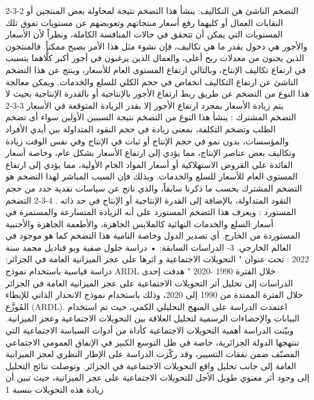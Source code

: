 \documentclass[12pt,a4paper]{report}
\begin{document}
2-3-2 التضخم الناشئ هن التكاليف:
ينشأ هذا التضخم نتيجة لمحاولة بعض المنتجين أو النقابات العمال أو كليهما رفع أسعار منتجاتهم وتعويضهم عن مستويات تفوق تلك المستويات التي يمكن أن تتحقق في حالات المنافسة الكاملة، ونظراً لأن الأسعار والأجور هي دخول بقدر ما هي تكاليف، فإن نشوء مثل هذا الأمر يصبح ممكناً.
فالمنتجون الذين يجنون من معدلات ربح أعلى، والعمال الذين يرغبون في أجور أكبر كلٌّاهما يتسبب في ارتفاع تكاليف الإنتاج، وبالتالي ارتفاع المستوى العام للأسعار، وينتج عن هذا التضخم الناشئ عن ارتفاع التكاليف انخفاض في حجم الكلي للسلع والخدمات. ويمكن معالجة هذا النوع من التضخم عن طريق ربط ارتفاع الأجور بالإنتاجية أو بالقدرة الإنتاجية بحيث لا يتم زيادة الأسعار بمجرد ارتفاع الأجور إلا بقدر الزيادة المتوقعة في الأسعار
3-3-2 التضخم المشترك : 
ينشأ هذا النوع من التضخم نتيجة السببين الأولين سواء أى تضخم الطلب وتضخم التكلفة، بمعنى زيادة في حجم النقود المتداولة بين أيدي الأفراد والمؤسسات، بدون نمو في حجم الإنتاج أو ثبات في الإنتاج وفي نفس الوقت زيادة وتكاليف بعض عناصر الإنتاج، مما يؤدي إلى ارتفاع الأسعار بشكل عام، وخاصة أسعار الفائدة على القروض الاستهلاكية أو أسعار المواد الخام الأولية، مما يؤدي إلى ارتفاع المستوى العام للأسعار للسلع والخدمات.
وبذلك فإن السبب المباشر لهذا التضخم هو التضخم المشترك بحسب ما ذكرنا سابقاً، والذي ناتج عن سياسات نقدية حدد من حجم النقود المتداولة، بالإضافة إلى القدرة الإنتاجية أو الإنتاج في حد ذاته . 
4-3-2 التضخم المستورد : 
ويعرف هذا التضخم المستورد على أنه الزيادة المتسارعة والمستمرة في أسعار السلع والخدمات النهائية كالملابس الجاهزة، والأطعمة الجاهزة والأجنبية المستوردة من الخارج. أي تصدير الدول وخاصة النامية هذا التضخم كما هو موجود في العالم الخارجي.
3- الدراسات السابقة:
  • دراسة جلول صفية وبو قناديل محمد سنة 2022 : تحت عنوان " التحويلات الاجتماعية و اثرها على عجز الميزانية العامة في الجزائر: دراسة قياسية باستخدام نموذج ARDL خلال الفترة 1990 -2020 " هدفت إحدى الدراسات إلى تحليل أثر التحويلات الاجتماعية على عجز الميزانية العامة في الجزائر خلال الفترة الممتدة من 1990 إلى 2020، وذلك باستخدام نموذج الانحدار الذاتي للإبطاء المُوزَّع (ARDL). اعتمدت الدراسة على المنهج التحليلي الكمي، حيث تم استخدام البيانات والإحصاءات الرسمية لتحليل العلاقة بين التحويلات الاجتماعية وعجز الميزانية. وبيّنت الدراسة أهمية التحويلات الاجتماعية كأداة من أدوات السياسة الاجتماعية التي تنتهجها الدولة الجزائرية، خاصة في ظل التوسع الكبير في الإنفاق العمومي الاجتماعي المصنّف ضمن نفقات التسيير، وقد ركّزت الدراسة على الإطار النظري لعجز الميزانية العامة إلى جانب تحليل واقع التحويلات الاجتماعية في الجزائر. وتوصلت نتائج التحليل إلى وجود أثر معنوي طويل الأجل للتحويلات الاجتماعية على عجز الميزانية، حيث تبين أن زيادة هذه التحويلات بنسبة 1%
\end{document}
